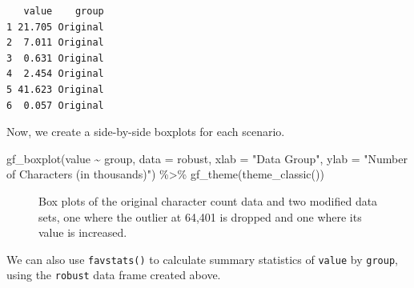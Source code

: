 \documentclass[
  letterpaper,
  DIV=11,
  numbers=noendperiod]{scrreprt}
\newenvironment{Shaded}{\begin{snugshade}}{\end{snugshade}}
\newcommand{\AttributeTok}[1]{\textcolor[rgb]{0.40,0.45,0.13}{#1}}
\newcommand{\FunctionTok}[1]{\textcolor[rgb]{0.28,0.35,0.67}{#1}}
\newcommand{\NormalTok}[1]{\textcolor[rgb]{0.00,0.23,0.31}{#1}}
\newcommand{\SpecialCharTok}[1]{\textcolor[rgb]{0.37,0.37,0.37}{#1}}
\newcommand{\StringTok}[1]{\textcolor[rgb]{0.13,0.47,0.30}{#1}}
\begin{document}
\begin{verbatim}
   value    group
1 21.705 Original
2  7.011 Original
3  0.631 Original
4  2.454 Original
5 41.623 Original
6  0.057 Original
\end{verbatim}

Now, we create a side-by-side boxplots for each scenario.

\begin{Shaded}
\begin{Highlighting}[]
\FunctionTok{gf\_boxplot}\NormalTok{(value }\SpecialCharTok{\textasciitilde{}}\NormalTok{ group, }\AttributeTok{data =}\NormalTok{ robust, }\AttributeTok{xlab =} \StringTok{"Data Group"}\NormalTok{,}
           \AttributeTok{ylab =} \StringTok{"Number of Characters (in thousands)"}\NormalTok{) }\SpecialCharTok{\%\textgreater{}\%}
   \FunctionTok{gf\_theme}\NormalTok{(}\FunctionTok{theme\_classic}\NormalTok{())}
\end{Highlighting}
\end{Shaded}

\begin{figure}[H]


\caption{\label{fig-box2}Box plots of the original character count data
and two modified data sets, one where the outlier at 64,401 is dropped
and one where its value is increased.}

\end{figure}%

We can also use \texttt{favstats()} to calculate summary statistics of
\texttt{value} by \texttt{group}, using the \texttt{robust} data frame
created above.
\end{document}
